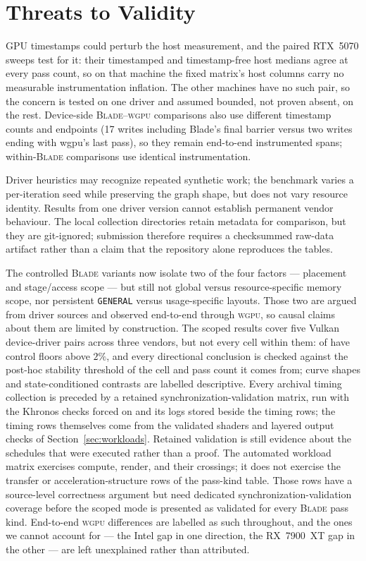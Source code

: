 \documentclass[10pt,twocolumn]{article}
\newcommand{\blade}{\textsc{Blade}}
\newcommand{\wgpu}{\textsc{wgpu}}
\begin{document}
\section{Threats to Validity}
\label{sec:threats}

GPU timestamps could perturb the host measurement, and the paired RTX~5070
sweeps test for it: their timestamped and timestamp-free host medians agree
at every pass count, so on that machine the fixed matrix's host columns carry
no measurable instrumentation inflation. The other machines have no such
pair, so the concern is tested on one driver and assumed bounded, not proven
absent, on the rest. Device-side \blade{}--\wgpu{} comparisons also use different
timestamp counts and endpoints (17 writes including Blade's final barrier
versus two writes ending with wgpu's last pass), so they remain end-to-end
instrumented spans; within-\blade{} comparisons use identical instrumentation.

Driver heuristics may recognize repeated synthetic work; the benchmark varies a
per-iteration seed while preserving the graph shape, but does not vary resource
identity. Results from one driver version cannot establish permanent vendor
behaviour. The local collection directories retain metadata for comparison,
but they are git-ignored; submission therefore requires a checksummed raw-data
artifact rather than a claim that the repository alone reproduces the tables.

The controlled \blade{} variants now isolate two of the four factors ---
placement and stage/access scope --- but still not global versus
resource-specific memory scope, nor persistent \texttt{GENERAL} versus
usage-specific layouts. Those two are argued from driver sources and observed
end-to-end through \wgpu, so causal claims about them are limited by
construction. The scoped results cover five Vulkan device-driver pairs across
three vendors, but not every cell within them:
 of  have control floors above
$2\%$, and every directional conclusion is checked against the post-hoc
stability threshold of the cell and pass count it comes from; curve shapes and
state-conditioned contrasts are labelled descriptive. Every archival timing
collection is
preceded by a retained synchronization-validation matrix, run with the
Khronos checks forced on and its logs stored beside the timing rows; the
timing rows themselves come from the validated shaders and layered output
checks of Section~\ref{sec:workloads}. Retained validation is still evidence
about the schedules that were executed rather than a proof.
The automated workload matrix exercises compute, render, and their crossings;
it does not exercise the transfer or acceleration-structure rows of the
pass-kind table. Those rows have a source-level correctness argument but need
dedicated synchronization-validation coverage before the scoped mode is
presented as validated for every \blade{} pass kind.
End-to-end \wgpu{} differences are labelled as such throughout, and the ones we
cannot account for --- the Intel gap in one direction, the RX~7900~XT gap in
the other --- are left unexplained rather than attributed.
\end{document}
